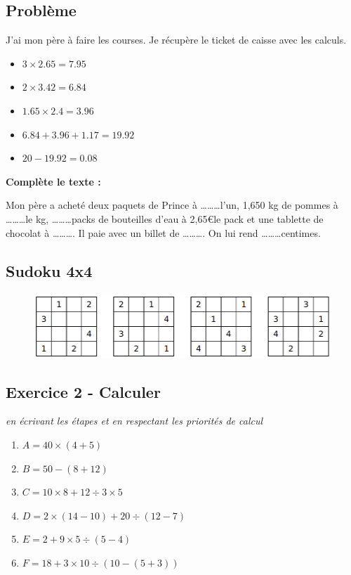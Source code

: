 \subsection*{Problème}

J'ai mon père à faire les courses. Je récupère le ticket de caisse avec les calculs.
\begin{itemize}
  \item $3 \times 2.65 = 7.95$
  \item $2 \times 3.42 = 6.84$
  \item $1.65 \times 2.4 = 3.96$
  \item $6.84 + 3.96 + 1.17 = 19.92$
  \item $20 - 19.92 = 0.08$
\end{itemize}

\textbf{Complète le texte : }

Mon père a acheté deux paquets de Prince à \ldots\ldots\ldots l'un, 1,650 kg de pommes à \ldots\ldots\ldots le kg, \ldots\ldots\ldots packs de bouteilles d'eau à 2,65\euro le pack et une tablette de chocolat à \ldots\ldots\ldots . Il paie avec un billet de \ldots\ldots\ldots . On lui rend \ldots\ldots\ldots centimes.

\subsection*{Sudoku 4x4}

\begin{figure}[H]
  \centering
  \includegraphics[width=0.8\linewidth]{5x1-calculs/sudoku-4b.png}
\end{figure}

\newpage

\subsection*{Exercice 2 - Calculer}
\textit{en écrivant les étapes et en respectant les priorités de calcul}

\begin{multicols}{3}\noindent

  \begin{enumerate}
    \item $A = 40 \times (4 + 5)$ 
    \item $B = 50 - (8 + 12)$ 
    \item $C = 10 \times 8 + 12 \div 3 \times 5$ 
    \item $D = 2 \times (14 - 10) + 20 \div (12-7)$ 
    \item $E = 2 + 9 \times 5 \div (5-4)$ 
    \item $F = 18 + 3 \times 10 \div (10-(5+3))$ 
  \end{enumerate}

\end{multicols}

\Pointilles[47]

